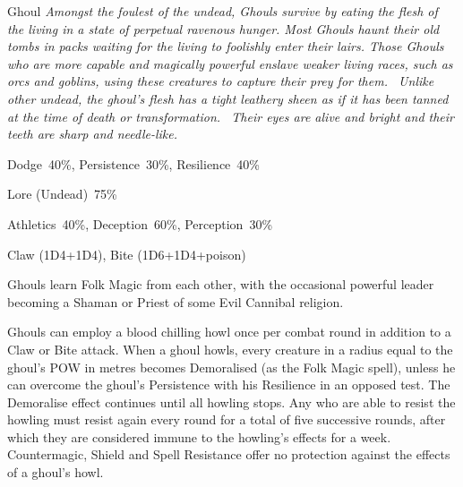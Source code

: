 \begin{monsterbox}{Ghoul}
	\textit{Amongst the foulest of the undead, Ghouls survive by eating the flesh of the living in a state of perpetual ravenous hunger. Most Ghouls haunt their old tombs in packs waiting for the living to foolishly enter their lairs. Those Ghouls who are more capable and magically powerful enslave weaker living races, such as orcs and goblins, using these creatures to capture their prey for them.  Unlike other undead, the ghoul’s flesh has a tight leathery sheen as if it has been tanned at the time of death or transformation.  Their eyes are alive and bright and their teeth are sharp and needle-like.}\\
	\rpghline
	\basics[%
        hitpoints  = 12, 
	majorwound = 6,
	damagemodifier = +1D4,
	powerpoints = 11,
	movementrate = 15m,
	armor = None,
	plunderrating = 1
	]
	\rpghline%
	\stats[ %
		STR = 4D6   (14),
		CON = 3D6   (11),
		DEX = 3D6   (11),
		SIZ = 2D6+6 (13),
		INT = 3D6   (11),
		POW = 3D6   (11),
		CHA = 1D6   (4)
	]
	\rpghline
	\begin{rpg-monsteraction}[Resistances]
		Dodge~40\%, Persistence~30\%, Resilience~40\%
	\end{rpg-monsteraction}
	\begin{rpg-monsteraction}[Knowledge]
		Lore (Undead)~75\%
	\end{rpg-monsteraction}
	\begin{rpg-monsteraction}[Practical]
		Athletics~40\%, Deception~60\%, Perception~30\%
	\end{rpg-monsteraction}
	\begin{rpg-monsteraction}
		Claw (1D4+1D4), Bite (1D6+1D4+poison)
	\end{rpg-monsteraction}
	\begin{rpg-monsteraction}[Magic]
		Ghouls learn Folk Magic from each other, with the occasional powerful leader becoming a Shaman or Priest of some Evil Cannibal religion.
	\end{rpg-monsteraction}
	\begin{rpg-monsteraction}
		Ghouls can employ a blood chilling howl once per combat round in addition to a Claw or Bite attack. When a ghoul howls, every creature in a radius equal to the ghoul’s POW in metres becomes Demoralised (as the Folk Magic spell), unless he can overcome the ghoul’s Persistence with his Resilience in an opposed test. The Demoralise effect continues until all howling stops. Any who are able to resist the howling must resist again every round for a total of five successive rounds, after which they are considered immune to the howling’s effects for a week. Countermagic, Shield and Spell Resistance offer no protection against the effects of a ghoul’s howl. 

\end{rpg-monsteraction}
\end{monsterbox}
